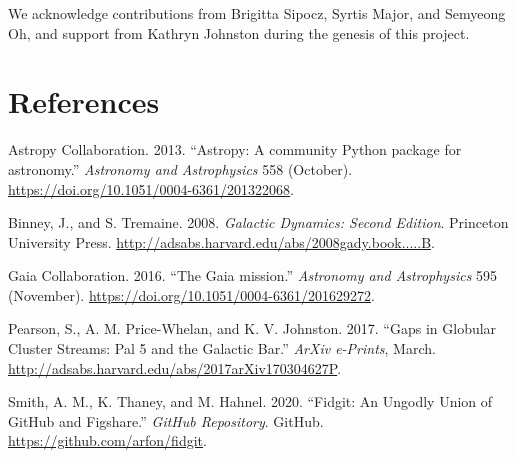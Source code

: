 \documentclass[
]{article}
\newlength{\cslhangindent}
\newenvironment{CSLReferences}[2] %
 {\begin{list}{}{%
  \setlength{\itemindent}{0pt}
  \setlength{\leftmargin}{0pt}
  \setlength{\parsep}{0pt}
  \ifodd #1
   \setlength{\leftmargin}{\cslhangindent}
   \setlength{\itemindent}{-1\cslhangindent}
  \fi
  \setlength{\itemsep}{#2\baselineskip}}}
 {\end{list}}
\begin{document}
We acknowledge contributions from Brigitta Sipocz, Syrtis Major, and
Semyeong Oh, and support from Kathryn Johnston during the genesis of
this project.

\section*{References}\label{references}

\label{refs}
\begin{CSLReferences}{1}{0}
Astropy Collaboration. 2013. {``{Astropy: A community Python package for
astronomy}.''} \emph{Astronomy and Astrophysics} 558 (October).
\url{https://doi.org/10.1051/0004-6361/201322068}.

Binney, J., and S. Tremaine. 2008. \emph{{Galactic Dynamics: Second
Edition}}. Princeton University Press.
\url{http://adsabs.harvard.edu/abs/2008gady.book.....B}.

Gaia Collaboration. 2016. {``{The Gaia mission}.''} \emph{Astronomy and
Astrophysics} 595 (November).
\url{https://doi.org/10.1051/0004-6361/201629272}.

Pearson, S., A. M. Price-Whelan, and K. V. Johnston. 2017. {``{Gaps in
Globular Cluster Streams: Pal 5 and the Galactic Bar}.''} \emph{ArXiv
e-Prints}, March.
\url{http://adsabs.harvard.edu/abs/2017arXiv170304627P}.

Smith, A. M., K. Thaney, and M. Hahnel. 2020. {``Fidgit: An Ungodly
Union of GitHub and Figshare.''} \emph{GitHub Repository}. GitHub.
\url{https://github.com/arfon/fidgit}.

\end{CSLReferences}
\end{document}
